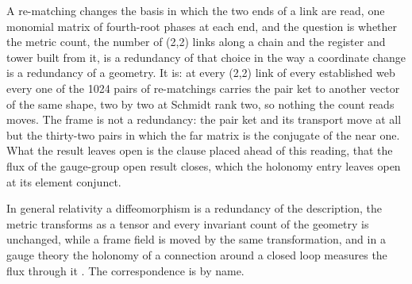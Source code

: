 A re-matching changes the basis in which the two ends of a link are read, one monomial matrix of fourth-root phases at each end, and the question is whether the metric count, the number of (2,2) links along a chain and the register and tower built from it, is a redundancy of that choice in the way a coordinate change is a redundancy of a geometry. It is: at every (2,2) link of every established web every one of the 1024 pairs of re-matchings carries the pair ket to another vector of the same shape, two by two at Schmidt rank two, so nothing the count reads moves. The frame is not a redundancy: the pair ket and its transport move at all but the thirty-two pairs in which the far matrix is the conjugate of the near one. What the result leaves open is the clause placed ahead of this reading, that the flux of the gauge-group open result closes, which the holonomy entry leaves open at its element conjunct.
\begin{chbridge}
In general relativity a diffeomorphism is a redundancy of the description, the metric transforms as a tensor and every invariant count of the geometry is unchanged, while a frame field is moved by the same transformation, and in a gauge theory the holonomy of a connection around a closed loop measures the flux through it \cite{Wald1984,Peskin1995}. The correspondence is by name.
\end{chbridge}
